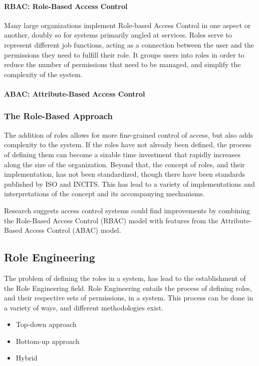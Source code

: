\paragraph{RBAC: Role-Based Access Control}
Many large organizations implement Role-based Access Control in one aspect or another\citep{RoleEngMethStd}, doubly so for systems primarily angled at services\citep{FormNormRBAC2009}. Roles serve to represent different job functions, acting as a connection between the user and the permissions they need to fulfill their role. It groups users into roles in order to reduce the number of permissions that need to be managed, and simplify the complexity of the system.

\paragraph{ABAC: Attribute-Based Access Control}

\subsubsection{The Role-Based Approach}
The addition of roles allows for more fine-grained control of access, but also adds complexity to the system. If the roles have not already been defined, the process of defining them can become a sizable time investment that rapidly increases along the size of the organization\citep{FormNormRBAC2009}. Beyond that, the concept of roles, and their implementation, has not been standardized, though there have been standards published by ISO\citep{ISO27001} and INCITS\citep{INCITS3592012}. This has lead to a variety of implementations and interpretations of the concept and its accompanying mechanisms\citep{RolesInInfoSec2011}.

Research suggests access control systems could find improvements by combining the Role-Based Access Control (RBAC) model with features from the Attribute-Based Access Control (ABAC) model\citep{addABACtoRBAC2010}.

\subsection{Role Engineering}
The problem of defining the roles in a system, has lead to the establishment of the Role Engineering field\citep{RoleEngMethStd}. Role Engineering entails the process of defining roles, and their respective sets of permissions, in a system. This process can be done in a variety of ways, and different methodologies exist\citep{RoleEngMethStd}.
\begin{itemize}
	\item Top-down approach
	\item Bottom-up approach
	\item Hybrid
\end{itemize}

